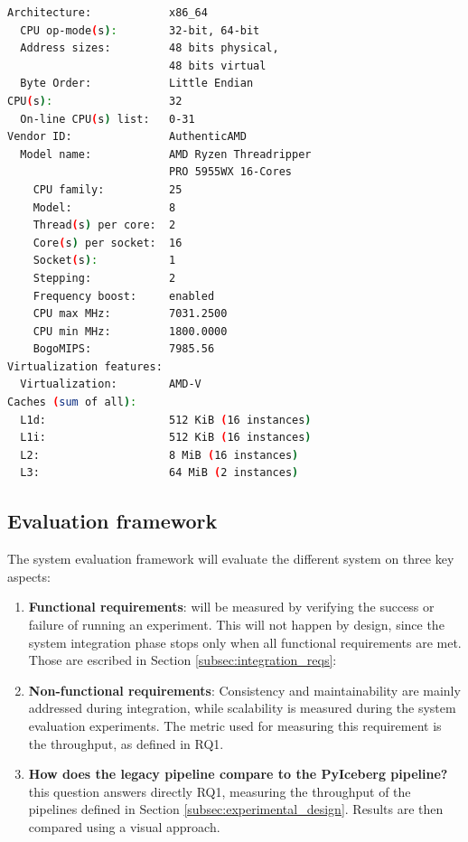 \begin{lstlisting}[language=bash, caption={[Experimental environment details]Output of a \textit{lscpu} bash command on the machine.}, label={lst:cpu_snurran}, frame=tb, basicstyle=\small]
Architecture:            x86_64
  CPU op-mode(s):        32-bit, 64-bit
  Address sizes:         48 bits physical, 
                         48 bits virtual
  Byte Order:            Little Endian
CPU(s):                  32
  On-line CPU(s) list:   0-31
Vendor ID:               AuthenticAMD
  Model name:            AMD Ryzen Threadripper 
                         PRO 5955WX 16-Cores
    CPU family:          25
    Model:               8
    Thread(s) per core:  2
    Core(s) per socket:  16
    Socket(s):           1
    Stepping:            2
    Frequency boost:     enabled
    CPU max MHz:         7031.2500
    CPU min MHz:         1800.0000
    BogoMIPS:            7985.56
Virtualization features: 
  Virtualization:        AMD-V
Caches (sum of all):     
  L1d:                   512 KiB (16 instances)
  L1i:                   512 KiB (16 instances)
  L2:                    8 MiB (16 instances)
  L3:                    64 MiB (2 instances)
\end{lstlisting}



\subsection{Evaluation framework}
\label{subsec:method_eval_framework_hudi_iceberg}

The system evaluation framework will evaluate the different system on three key aspects:
\begin{enumerate}
    \item \textbf{Functional requirements}: will be measured by verifying the success or failure of running an experiment. This will not happen by design, since the system integration phase stops only when all functional requirements are met. Those are escribed in Section \ref{subsec:integration_reqs}:
    \item \textbf{Non-functional requirements}: Consistency and maintainability are mainly addressed during integration, while scalability is measured during the system evaluation experiments. The metric used for measuring this requirement is the throughput, as defined in \gls{RQ}1.
    \item \textbf{How does the legacy pipeline compare to the PyIceberg pipeline?} this question answers directly \gls{RQ}1, measuring the throughput of the pipelines defined in Section \ref{subsec:experimental_design}. Results are then compared using a visual approach.
\end{enumerate} 



